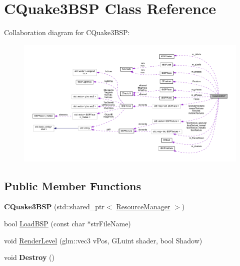 \hypertarget{class_c_quake3_b_s_p}{}\section{C\+Quake3\+B\+SP Class Reference}
\label{class_c_quake3_b_s_p}


Collaboration diagram for C\+Quake3\+B\+SP\+:
\nopagebreak
\begin{figure}[H]
\begin{center}
\leavevmode
\includegraphics[width=350pt]{class_c_quake3_b_s_p__coll__graph}
\end{center}
\end{figure}
\subsection*{Public Member Functions}
\begin{DoxyCompactItemize}
\item 
{\bfseries C\+Quake3\+B\+SP} (std\+::shared\+\_\+ptr$<$ \hyperlink{class_resource_manager}{Resource\+Manager} $>$)\hypertarget{class_c_quake3_b_s_p_ade103aa4e41c95c7d8d96e4dc8fa5b6e}{}\label{class_c_quake3_b_s_p_ade103aa4e41c95c7d8d96e4dc8fa5b6e}

\item 
bool \hyperlink{class_c_quake3_b_s_p_a63f458d8e84eb5a4f0432460c849ba75}{Load\+B\+SP} (const char $\ast$str\+File\+Name)
\item 
void \hyperlink{class_c_quake3_b_s_p_adb06c36ee906c9c4db1d16c1642c3aa2}{Render\+Level} (glm\+::vec3 v\+Pos, G\+Luint shader, bool Shadow)
\item 
void {\bfseries Destroy} ()\hypertarget{class_c_quake3_b_s_p_aa61b5bb7e4dfe39ce88a023f438cbe77}{}\label{class_c_quake3_b_s_p_aa61b5bb7e4dfe39ce88a023f438cbe77}

\end{DoxyCompactItemize}

